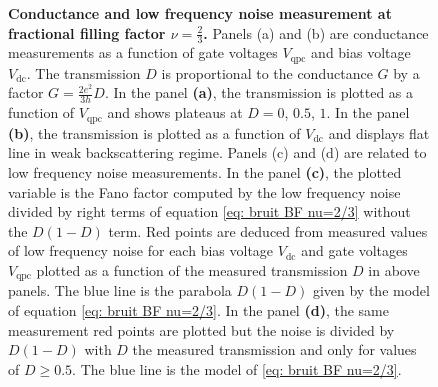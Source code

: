 \begin{figure}[hptb]
\begin{center}
\begin{tabular}{c c c c}
		\end{tabular}
	\end{center}
	
	\caption{\textbf{Conductance and low frequency noise measurement at fractional filling factor $\nu = \frac{2}{3}$.} Panels (a) and (b) are conductance measurements as a function of gate voltages $V_{\mathrm{qpc}}$ and bias voltage $V_{\mathrm{dc}}$. The transmission $D$ is proportional to the conductance $G$ by a factor $G = \frac{2e^{2}}{3h}D$. In the panel \textbf{(a)}, the transmission is plotted as a function of $V_{\mathrm{qpc}}$ and shows plateaus at $D = 0$, $0.5$, $1$. In the panel \textbf{(b)}, the transmission is plotted as a function of $V_{\mathrm{dc}}$ and displays flat line in weak backscattering regime. Panels (c) and (d) are related to low frequency noise measurements. In the panel \textbf{(c)}, the plotted variable is the Fano factor computed by the low frequency noise divided by right terms of equation \eqref{eq: bruit BF nu=2/3} without the $D\left(1-D\right)$ term. Red points are deduced from measured values of low frequency noise for each bias voltage $V_{\mathrm{dc}}$ and gate voltages $V_{\mathrm{qpc}}$ plotted as a function of the measured transmission $D$ in above panels. The blue line is the parabola $D\left(1-D\right)$ given by the model of equation \eqref{eq: bruit BF nu=2/3}. In the panel \textbf{(d)}, the same measurement red points are plotted but the noise is divided by $D\left(1-D\right)$ with $D$ the measured transmission and only for values of $D \geq 0.5$. The blue line is the model of \eqref{eq: bruit BF nu=2/3}.}
	\label{fig: LF charac at 2/3}
\end{figure}

